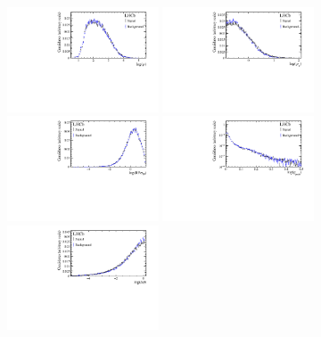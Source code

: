 \begin{figure}[tbp]
	\begin{center}
		\includegraphics[width=0.40\textwidth]{09FlavourTagging/figs/BDT_P_flat_log.pdf}
		\includegraphics[width=0.40\textwidth]{09FlavourTagging/figs/BDT_Pt_flat_log.pdf}\\
		\includegraphics[width=0.40\textwidth]{09FlavourTagging/figs/BDT_TagPart_IPsig_BENDVERTEX_log.pdf}
		\includegraphics[width=0.40\textwidth]{09FlavourTagging/figs/BDT_gprob_flat.pdf}\\
		\includegraphics[width=0.40\textwidth]{09FlavourTagging/figs/BDT_dphi_flat_log.pdf}

\end{center}
\end{figure}

